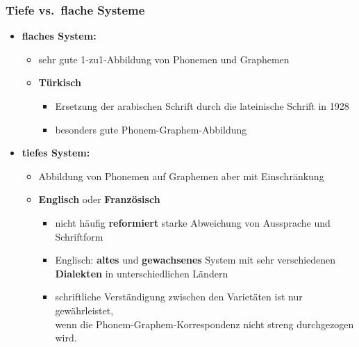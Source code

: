 \begin{frame}
\frametitle{Tiefe vs.\ flache Systeme}
\begin{itemize}
	
	\item \textbf{flaches System:}

	\begin{itemize}
		
		\item sehr gute 1-zu1-Abbildung von Phonemen und Graphemen
		
		\item \textbf{Türkisch}
		
		\begin{itemize}
			
			\item Ersetzung der arabischen Schrift durch die lateinische Schrift in 1928
			
			\item besonders gute Phonem-Graphem-Abbildung
		\end{itemize}
	\end{itemize}

\pause 

	\item \textbf{tiefes System:}

\begin{itemize}

	\item Abbildung von Phonemen auf Graphemen aber mit Einschränkung

	\item \textbf{Englisch} oder \textbf{Französisch}
	
	\begin{itemize}
		\item nicht häufig \textbf{reformiert} \ras starke Abweichung von Aussprache und Schriftform

		\item Englisch: \textbf{altes} und \textbf{gewachsenes} System mit sehr verschiedenen \textbf{Dialekten} in unterschiedlichen Ländern

		\item schriftliche Verständigung zwischen den Varietäten ist nur gewährleistet,\\
		wenn die Phonem-Graphem-Korrespondenz nicht streng durchgezogen wird.
	\end{itemize}
\end{itemize}
\end{itemize}

\end{frame}


